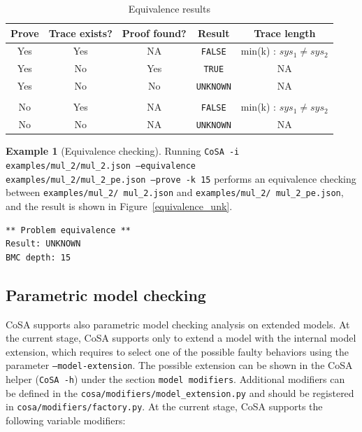 \documentclass{article}
\theoremstyle{definition}
\newtheorem{example}{Example}[section]
\begin{document}
\begin{table}[h]
  \centering
\begin{tabular}{ c c c | c c }
  Prove & Trace exists? & Proof found? & Result & Trace length \\ \hline
  Yes & Yes & NA & \texttt{FALSE} & min(k) : $sys_1 \neq sys_2$  \\
  Yes & No & Yes & \texttt{TRUE} & NA  \\
  Yes & No & No & \texttt{UNKNOWN} & NA  \\ \\
  No & Yes & NA & \texttt{FALSE} & min(k) : $sys_1 \neq sys_2$  \\
  No & No & NA & \texttt{UNKNOWN} & NA  \\
\end{tabular}
\caption{Equivalence results}
\label{tab:equivalence_results}
\end{table}


\begin{example}[Equivalence checking]
  Running \texttt{CoSA -i examples/mul\_2/mul\_2.json --equivalence \\
    examples/mul\_2/mul\_2\_pe.json --prove -k 15} performs an
  equivalence checking between \texttt{examples/mul\_2/ mul\_2.json}
  and \texttt{examples/mul\_2/
    mul\_2\_pe.json}, and the result is
  shown in Figure~\ref{equivalence_unk}.

\begin{lstlisting}[frame=single,language=ets,caption=Equivalence example (UNKNOWN),label=equivalence_unk]
** Problem equivalence **
Result: UNKNOWN
BMC depth: 15
\end{lstlisting}

\end{example}

\subsection{Parametric model checking}

CoSA supports also parametric model checking analysis on extended
models. At the current stage, CoSA supports only to extend a model
with the internal model extension, which requires to select one of the
possible faulty behaviors using the parameter
\texttt{--model-extension}. The possible extension can be shown in the
CoSA helper (\texttt{CoSA -h}) under the section \texttt{model
  modifiers}. Additional modifiers can be defined in the
\texttt{cosa/modifiers/model\_extension.py} and should be registered
in \texttt{cosa/modifiers/factory.py}. At the current stage, CoSA
supports the following variable modifiers:
\end{document}
